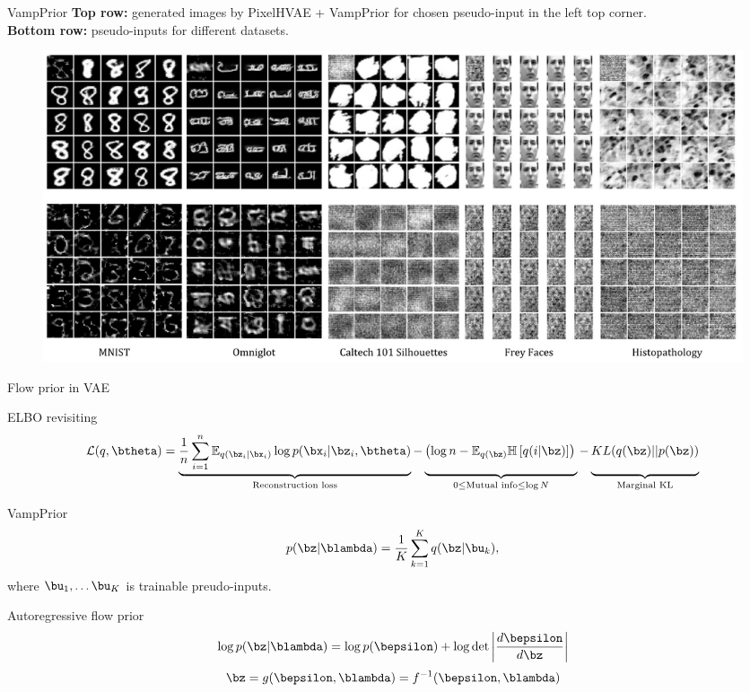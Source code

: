 \begin{frame}{VampPrior}
	\vspace{0.1cm}
	\textbf{Top row:} generated images by PixelHVAE + VampPrior for chosen pseudo-input in the left top corner. \\
	\vspace{0.1cm}
	\textbf{Bottom row:} pseudo-inputs for different datasets.
	\begin{figure}[h]
		\centering
		\includegraphics[width=1.0\linewidth]{figs/VampPrior_4.png}
	\end{figure}
\end{frame}
\begin{frame}{Flow prior in VAE}
	
	\begin{block}{ELBO revisiting}
		\vspace{-0.4cm}
		{\footnotesize
			\[
			\mathcal{L}(q, \btheta) = \underbrace{\frac{1}{n} \sum_{i=1}^n \mathbb{E}_{q(\bz_i | \bx_i)} \log p(\bx_i | \bz_i, \btheta)}_{\text{Reconstruction loss}} - \underbrace{\left(\log n - \mathbb{E}_{q(\bz)} \mathbb{H} \left[ q(i | \bz) \right] \right)\vphantom{\sum_{i=1}}}_{0 \leq \text{Mutual info} \leq \log N } - \underbrace{KL(q(\bz) || p(\bz))\vphantom{\sum_{i=1}}}_{\text{Marginal KL}}
			\]}
	\end{block}
	\vspace{-0.5cm}
	\begin{block}{VampPrior}
		\vspace{-0.5cm}
		\[
			p(\bz | \blambda) = \frac{1}{K} \sum_{k=1}^K q(\bz | \bu_k),
		\]
	where $\bu_1, \dots \bu_K$ is trainable preudo-inputs.
	\end{block}
	\begin{block}{Autoregressive flow prior}
		\vspace{-0.3cm}
		\[
			\log p(\bz | \blambda) = \log p(\bepsilon) + \log \det \left | \frac{d \bepsilon}{d\bz}\right|
		\]
		\[
			\bz = g(\bepsilon, \blambda) = f^{-1}(\bepsilon, \blambda)
		\]
	\end{block}
\end{frame}
